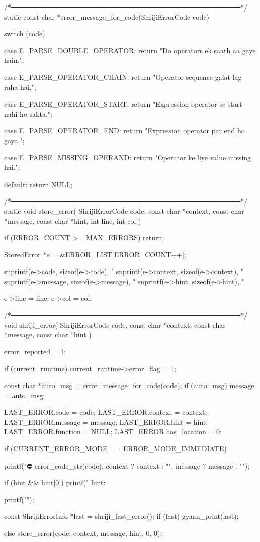 \documentclass{article}
\begin{document}
/*──────────────────────────────────────────────*/
static const char *error_message_for_code(ShrijiErrorCode code)
{
    switch (code) {

        case E_PARSE_DOUBLE_OPERATOR:
            return "Do operators ek saath aa gaye hain.";

        case E_PARSE_OPERATOR_CHAIN:
            return "Operator sequence galat lag raha hai.";

        case E_PARSE_OPERATOR_START:
            return "Expression operator se start nahi ho sakta.";

        case E_PARSE_OPERATOR_END:
            return "Expression operator par end ho gaya.";

        case E_PARSE_MISSING_OPERAND:
            return "Operator ke liye value missing hai.";

        default:
            return NULL;
    }
}


/*──────────────────────────────────────────────*/
static void store_error(
    ShrijiErrorCode code,
    const char *context,
    const char *message,
    const char *hint,
    int line,
    int col
)
{
    if (ERROR_COUNT >= MAX_ERRORS) return;

    StoredError *e = &ERROR_LIST[ERROR_COUNT++];

    snprintf(e->code, sizeof(e->code), "%
    snprintf(e->context, sizeof(e->context), "%
    snprintf(e->message, sizeof(e->message), "%
    snprintf(e->hint, sizeof(e->hint), "%

    e->line = line;
    e->col = col;
}


/*──────────────────────────────────────────────*/
void shriji_error(
    ShrijiErrorCode code,
    const char *context,
    const char *message,
    const char *hint
)
{
    error_reported = 1;

    if (current_runtime) {
        current_runtime->error_flag = 1;
    }

    const char *auto_msg = error_message_for_code(code);
    if (auto_msg)
        message = auto_msg;

    LAST_ERROR.code = code;
    LAST_ERROR.context = context;
    LAST_ERROR.message = message;
    LAST_ERROR.hint = hint;
    LAST_ERROR.function = NULL;
    LAST_ERROR.has_location = 0;

    if (CURRENT_ERROR_MODE == ERROR_MODE_IMMEDIATE) {

        printf("\n⛔ %
               error_code_str(code),
               context ? context : "",
               message ? message : "");

        if (hint && hint[0])
            printf("   hint: %

        printf("\n");

        const ShrijiErrorInfo *last = shriji_last_error();
        if (last) {
            gyaan_print(last);
        }

    } else {
        store_error(code, context, message, hint, 0, 0);
    }
}
\end{document}
